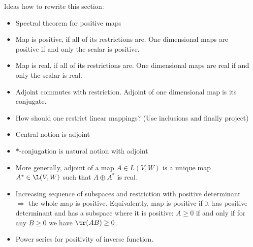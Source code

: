 Ideas how to rewrite this section:
\begin{itemize}
	\item Spectral theorem for positive maps
	\item Map is positive, if all of its restrictions are. One dimensional maps are positive if and only the scalar is positive.
	\item Map is real, if all of its restrictions are. One dimensional maps are real if and only the scalar is real.
	\item Adjoint commutes with restriction. Adjoint of one dimensional map is its conjugate.
	\item How should one restrict linear mappings? (Use inclusions and finally project)
	\item Central notion is adjoint
	\item $*$-conjugation is natural notion with adjoint
	\item More generally, adjoint of a map $A \in L(V, W)$ is a unique map $A^{*} \in \L(V, W)$ such that $A \oplus A^{*}$ is real.
	\item Increasing sequence of subspaces and restriction with positive determinant $\Rightarrow$ the whole map is positive. Equivalently, map is positive if it has positive determinant and has a subspace where it is positive: $A \geq 0$ if and only if for any $B \geq 0$ we have $\tr(A B) \geq 0$.
	\item Power series for positivity of inverse function.
\end{itemize}





